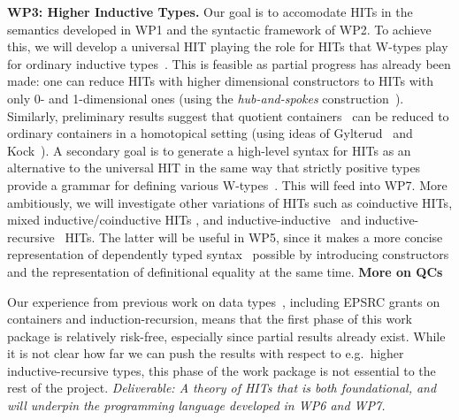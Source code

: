 \documentclass[a4paper,11pt]{article}
\begin{document}
{\bf WP3: Higher Inductive Types.} Our goal is to accomodate HITs in
the semantics developed in WP1 and the syntactic framework of WP2. To
achieve this, we will develop a universal HIT playing the role for
HITs that W-types play for ordinary inductive
types~\cite{alti:icalp04}. This is feasible as partial progress has
already been made: one can reduce HITs with higher dimensional
constructors to HITs with only 0- and 1-dimensional ones (using the
\emph{hub-and-spokes} construction~\cite{hott-book}).
Similarly, preliminary results suggest that quotient
containers~\cite{abottAltenGhaniMcB:quotientContainers} can be reduced
to ordinary containers in a homotopical setting 
(using ideas of Gylterud~\cite{gylterud:thesis} and
Kock~\cite{kock:groupoids}).
%
A secondary goal is to generate a high-level syntax for HITs as
an alternative to the universal HIT in the same way that strictly
positive types provide a grammar for defining various
W-types~\cite{alti:cont-tcs,alti:jcats07}.  This will feed into WP7.
More ambitiously, we will %
investigate other variations of HITs such as coinductive HITs, mixed
inductive/coinductive HITs \cite{txa:mpc2010g}, and
inductive-inductive~\cite{fnf:indind} and
inductive-recursive~\cite{DS:indrec} HITs. The latter will be useful
in WP5, since it makes a more concise representation of dependently
typed syntax~\cite{chapman2009type} possible by introducing
constructors and the representation of definitional equality at the
same time.
{\bf More on QCs}

Our experience from previous work on data
types~\cite{alti:cont-tcs,alti:lics09,txa:cie10,alti:catind2,ghani:fibredIR,gambinoHyland:welfoundedTrees,awodeyGamSoja:indTypesInHTT},
including EPSRC grants on containers and induction-recursion, means
that the first phase of this work package is relatively risk-free,
especially since partial results already exist.
While it is not clear how far we can push the results with respect to
e.g.\ higher inductive-recursive types, this phase of the work package
is not essential to the rest of the project. {\em Deliverable: A
  theory of HITs that is both foundational, and will underpin the
  programming language developed in WP6 and WP7.}
\end{document}

